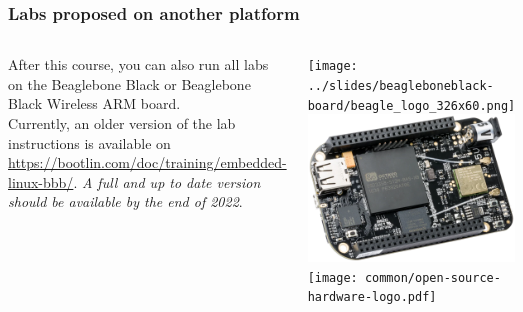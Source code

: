 \begin{frame}
\frametitle{Labs proposed on another platform}
  \begin{columns}
    After this course, you can also run all labs on the Beaglebone Black
    or Beaglebone Black Wireless ARM board.\\
    \vspace{1em}
    Currently, an older version of the lab instructions is available on
    \url{https://bootlin.com/doc/training/embedded-linux-bbb/}. {\em A full
    and up to date version should be available by the end of 2022}.
    \begin{center}
      \texttt{[image: ../slides/beagleboneblack-board/beagle\_logo\_326x60.png]}\\
      \includegraphics[width=\textwidth]{../slides/beagleboneblack-board/beagleboneblack.png}\\
      \texttt{[image: common/open-source-hardware-logo.pdf]}
    \end{center}
  \end{columns}
\end{frame}
